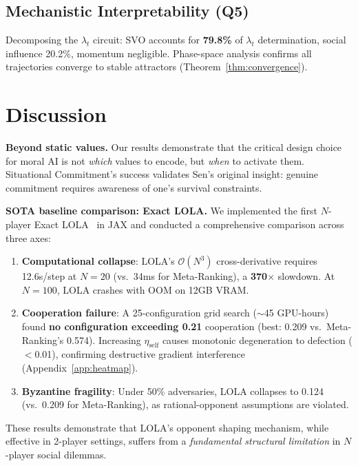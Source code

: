 \documentclass{article}
\begin{document}
\subsection{Mechanistic Interpretability (Q5)}

Decomposing the $\lambda_t$ circuit: SVO accounts for \textbf{79.8\%} of $\lambda_t$ determination, social influence 20.2\%, momentum negligible. Phase-space analysis confirms all trajectories converge to stable attractors (Theorem~\ref{thm:convergence}).

\section{Discussion}

\textbf{Beyond static values.} Our results demonstrate that the critical design choice for moral AI is not \textit{which} values to encode, but \textit{when} to activate them. Situational Commitment's success validates Sen's original insight: genuine commitment requires awareness of one's survival constraints.

\begin{sloppypar}
\textbf{SOTA baseline comparison: Exact LOLA.}
We implemented the first $N$-player Exact LOLA~\cite{foerster2018learning} in JAX and conducted a comprehensive comparison across three axes:
\end{sloppypar}
\begin{enumerate}
    \item \textbf{Computational collapse}: LOLA's $\mathcal{O}(N^3)$ cross-derivative requires 12.6s/step at $N{=}20$ (vs.\ 34ms for Meta-Ranking), a \textbf{370$\times$} slowdown. At $N{=}100$, LOLA crashes with OOM on 12GB VRAM.
    \item \textbf{Cooperation failure}: A 25-configuration grid search (${\sim}$45 GPU-hours) found \textbf{no configuration exceeding 0.21} cooperation (best: 0.209 vs.\ Meta-Ranking's 0.574). Increasing $\eta_{\text{self}}$ causes monotonic degeneration to defection ($<$0.01), confirming destructive gradient interference (Appendix~\ref{app:heatmap}).
    \item \textbf{Byzantine fragility}: Under 50\% adversaries, LOLA collapses to 0.124 (vs.\ 0.209 for Meta-Ranking), as rational-opponent assumptions are violated.
\end{enumerate}
These results demonstrate that LOLA's opponent shaping mechanism, while effective in 2-player settings, suffers from a \textit{fundamental structural limitation} in $N$-player social dilemmas.
\end{document}

